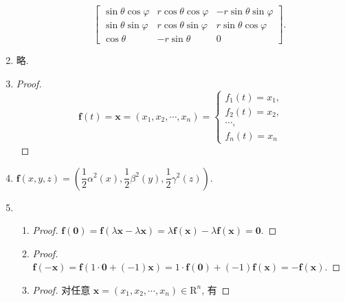 \documentclass[a4paper, 11pt]{ctexart}
\begin{document}
\begin{enumerate}
\begin{enumerate}[(1)]
\[\begin{bmatrix}
                        \sin\theta\cos\varphi & r\cos\theta\cos\varphi & -r\sin\theta\sin\varphi \\
                        \sin\theta\sin\varphi & r\cos\theta\sin\varphi & r\sin\theta\cos\varphi \\
                        \cos\theta & -r\sin\theta & 0
                    \end{bmatrix}.    
                \]
        \end{enumerate}
    \item %
        略.
    \item %
        \begin{proof}
            \[
                \boldsymbol{f}(t) = \boldsymbol{x} = (x_1, x_2, \cdots, x_n) =
                \begin{cases}
                    f_1(t) = x_1, \\
                    f_2(t) = x_2, \\
                    \cdots, \\
                    f_n(t) = x_n
                \end{cases}    
            \]
        \end{proof}
    \item %
        $\boldsymbol{f}(x, y, z) = \left(\dfrac12\alpha^2(x), \dfrac12\beta^2(y), \dfrac12\gamma^2(z)\right)$.
    \item %
        \begin{enumerate}[(1)]
            \item %
                \begin{proof}
                    $\boldsymbol{f}(\boldsymbol{0}) = \boldsymbol{f}(\lambda\boldsymbol{x} - \lambda\boldsymbol{x}) = \lambda\boldsymbol{f}(\boldsymbol{x}) - \lambda\boldsymbol{f}(\boldsymbol{x}) = \boldsymbol{0}$.
                \end{proof}
            \item %
                \begin{proof}
                    $\boldsymbol{f}(-\boldsymbol{x}) = \boldsymbol{f}(1 \cdot \boldsymbol{0} + (-1)\boldsymbol{x}) = 1\cdot\boldsymbol{f}(\boldsymbol{0}) + (-1)\boldsymbol{f}(\boldsymbol{x}) = -\boldsymbol{f}(\boldsymbol{x})$.
                \end{proof}
            \item %
                \begin{proof}
                    对任意 $\boldsymbol{x} = (x_1, x_2, \cdots, x_n) \in \mathrm{R}^n$, 有

\end{proof}
\end{enumerate}
\end{enumerate}
\end{document}
